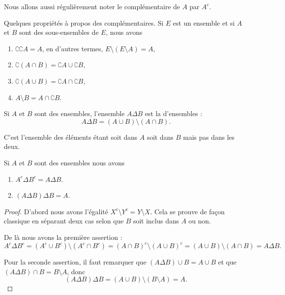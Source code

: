 Nous allons aussi régulièrement noter le complémentaire de \( A\) par \( A^c\).

\begin{lemma}		\label{LemPropsComplement}
	Quelques propriétés à propos des complémentaires. Si $E$ est un ensemble et si $A$ et $B$ sont des sous-ensembles de $E$, nous avons
	\begin{enumerate}
		\item
			$\complement \complement A =A $, en d'autres termes, $E\setminus(E\setminus A)=A$,
		\item
			$\complement(A\cap B)=\complement A\cup\complement B$,
		\item
			$\complement(A\cup B)=\complement A\cap\complement B$,
		\item	\label{ItemLemPropComplementiii}
			$A\setminus B=A\cap\complement B$.
	\end{enumerate}
\end{lemma}

\begin{definition}    \label{DefBMLooVjlSG}
    Si \( A\) et \( B\) sont des ensembles, l'ensemble \( A\Delta B\) est la  d'ensembles :
    \begin{equation}
        A\Delta B=(A\cup B)\setminus(A\cap B).
    \end{equation}
\end{definition}
C'est l'ensemble des éléments étant soit dans \( A\) soit dans \( B\) mais pas dans les deux.

\begin{lemma}   \label{LemCUVoohKpWB}
    Si \( A\) et \( B\) sont des ensembles nous avons
    \begin{enumerate}
        \item\label{ItemVUCooHAztC}
            \( A^c\Delta B^c=A\Delta B\).
        \item\label{ItemVUCooHAztCii}
            \( (A\Delta B)\Delta B=A\).
    \end{enumerate}
\end{lemma}

\begin{proof}
    D'abord nous avons l'égalité \( X^c\setminus Y^c=Y\setminus X\). Cela se prouve de façon classique en séparant deux cas selon que \( B\) soit inclus dans \( A\) ou non.

    De là nous avons la première assertion :
    \begin{equation}
        A^c\Delta B^c=(A^c\cup B^c)\setminus(A^c\cap B^c)=(A\cap B)^c\setminus(A\cup B)^c=(A\cup B)\setminus (A\cap B)=A\Delta B.
    \end{equation}

    Pour la seconde assertion, il faut remarquer que \( (A\Delta B)\cup B=A\cup B\) et que \( (A\Delta B)\cap B=B\setminus A\), donc
    \begin{equation}
        (A\Delta B)\Delta B=(A\cup B)\setminus (B\setminus A)=A.
    \end{equation}
\end{proof}

